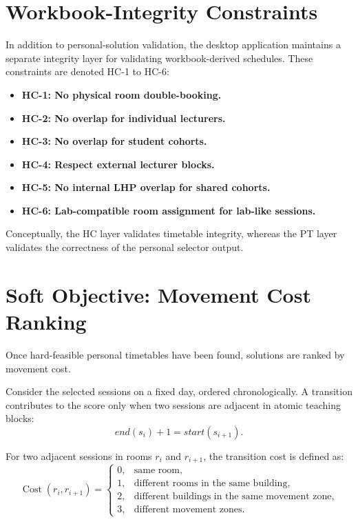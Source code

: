 \documentclass{article}
\newcommand{\Cost}{\operatorname{Cost}}
\begin{document}
\section{Workbook-Integrity Constraints}

In addition to personal-solution validation, the desktop application maintains a separate integrity layer for validating workbook-derived schedules. These constraints are denoted HC-1 to HC-6:
\begin{itemize}
    \item \textbf{HC-1: No physical room double-booking.}
    \item \textbf{HC-2: No overlap for individual lecturers.}
    \item \textbf{HC-3: No overlap for student cohorts.}
    \item \textbf{HC-4: Respect external lecturer blocks.}
    \item \textbf{HC-5: No internal LHP overlap for shared cohorts.}
    \item \textbf{HC-6: Lab-compatible room assignment for lab-like sessions.}
\end{itemize}

Conceptually, the HC layer validates timetable integrity, whereas the PT layer validates the correctness of the personal selector output.

\section{Soft Objective: Movement Cost Ranking}

Once hard-feasible personal timetables have been found, solutions are ranked by movement cost.

Consider the selected sessions on a fixed day, ordered chronologically. A transition contributes to the score only when two sessions are adjacent in atomic teaching blocks:
\begin{equation}
end(s_i) + 1 = start(s_{i+1}).
\label{eq:adjacency}
\end{equation}

For two adjacent sessions in rooms $r_i$ and $r_{i+1}$, the transition cost is defined as:
\begin{equation}
\Cost(r_i, r_{i+1}) =
\begin{cases}
0, & \text{same room}, \\
1, & \text{different rooms in the same building}, \\
2, & \text{different buildings in the same movement zone}, \\
3, & \text{different movement zones}.
\end{cases}
\label{eq:movement_cost}
\end{equation}
\end{document}
